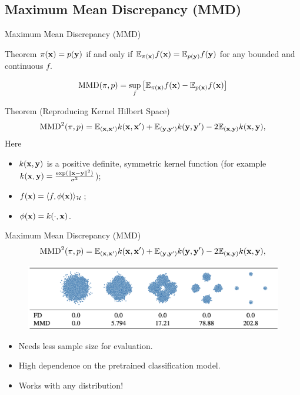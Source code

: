 \subsection{Maximum Mean Discrepancy (MMD)}
\begin{frame}{Maximum Mean Discrepancy (MMD)}
	\begin{block}{Theorem}
		$\pi(\mathbf{x}) = p(\mathbf{y})$ if and only if $\mathbb{E}_{\pi(\mathbf{x})} f(\mathbf{x}) = \mathbb{E}_{p(\mathbf{y})} f(\mathbf{y})$ for any bounded and continuous $f$.
	\end{block}
	\vspace{-0.3cm}
	\[
		\text{MMD}(\pi, p) = \sup_f \left[ \mathbb{E}_{\pi(\mathbf{x})} f(\mathbf{x}) - \mathbb{E}_{p(\mathbf{x})} f(\mathbf{x}) \right]
	\]	
	\vspace{-0.3cm}
	\begin{block}{Theorem (Reproducing Kernel Hilbert Space)}
		\vspace{-0.6cm}
		\[
			\text{MMD}^2(\pi, p) = \mathbb{E}_{(\mathbf{x}, \mathbf{x}')} k(\mathbf{x}, \mathbf{x}') + \mathbb{E}_{(\mathbf{y}, \mathbf{y}')} k(\mathbf{y}, \mathbf{y}') - 2 \mathbb{E}_{(\mathbf{x}, \mathbf{y})} k(\mathbf{x}, \mathbf{y}),
		\]
		Here 
		\begin{itemize}
			\item $k(\mathbf{x}, \mathbf{y})$ is a positive definite, symmetric kernel function (for example $k(\mathbf{x}, \mathbf{y}) = \frac{\exp(\|\mathbf{x} - \mathbf{y}\|^2)}{\sigma^2}$);
			\item $f(\mathbf{x}) = \langle f, \phi(\mathbf{x}) \rangle_{\mathcal{H}}$;
			\item $\phi(\mathbf{x}) = k(\cdot, \mathbf{x})$.
		\end{itemize} 
		\vspace{-0.3cm}
	\end{block}
\end{frame}
\begin{frame}{Maximum Mean Discrepancy (MMD)}
		\vspace{-0.6cm}
		\[
			\text{MMD}^2(\pi, p) = \mathbb{E}_{(\mathbf{x}, \mathbf{x}')} k(\mathbf{x}, \mathbf{x}') + \mathbb{E}_{(\mathbf{y}, \mathbf{y}')} k(\mathbf{y}, \mathbf{y}') - 2 \mathbb{E}_{(\mathbf{x}, \mathbf{y})} k(\mathbf{x}, \mathbf{y}),
		\]
		\vspace{-0.3cm}
	\begin{figure}
		\includegraphics[width=0.95\linewidth]{figs/mmd_normal}
	\end{figure}
	\begin{itemize}
		\item Needs less sample size for evaluation.
		\item High dependence on the pretrained classification model.
		\item Works with any distribution!
	\end{itemize}
\end{frame}
